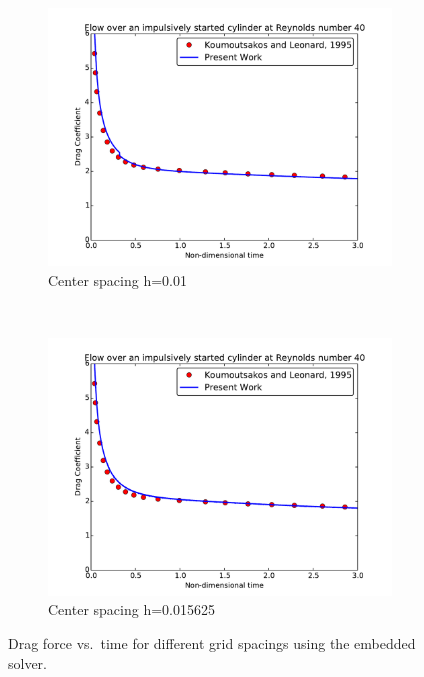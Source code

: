 \begin{figure}[!htb]
	\centering
	\begin{subfigure}{0.48\textwidth}
		\includegraphics[width=\linewidth]{embedded01}
		\caption{Center spacing h=0.01}
	\end{subfigure}
	~
	\begin{subfigure}{0.48\textwidth}
		\includegraphics[width=\linewidth]{embedded015625}
		\caption{Center spacing h=0.015625}
	\end{subfigure}
	\caption{Drag force vs.~time for different grid spacings using the embedded solver.}
	\label{fig:embedded005}
\end{figure}
